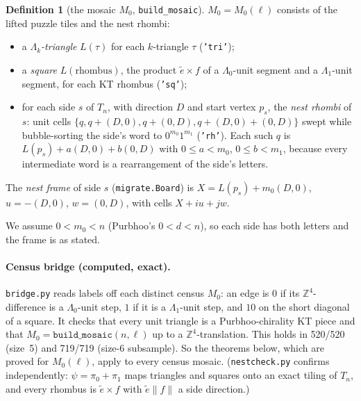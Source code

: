 \documentclass[11pt]{article}
\theoremstyle{definition}\newtheorem{definition}[theorem]{Definition}\newtheorem{remark}[theorem]{Remark}
\newcommand{\Z}{\mathbb Z}\newcommand{\R}{\mathbb R}
\begin{document}
\begin{definition}[the mosaic $M_0$, \texttt{build\_mosaic}]\label{def:M0}
$M_0=M_0(\ell)$ consists of the lifted puzzle tiles and the nest rhombi:
\begin{itemize}
\item a \emph{$\Lambda_k$-triangle} $L(\tau)$ for each $k$-triangle $\tau$ (\texttt{'tri'});
\item a \emph{square} $L(\text{rhombus})$, the product $\tilde e\times f$ of a $\Lambda_0$-unit segment and a $\Lambda_1$-unit segment, for each KT rhombus (\texttt{'sq'});
\item for each side $s$ of $T_n$, with direction $D$ and start vertex $p_s$, the \emph{nest rhombi} of $s$: unit cells $\{q,q+(D,0),q+(0,D),q+(D,0)+(0,D)\}$ swept while bubble-sorting the side's word to $0^{m_0}1^{m_1}$ (\texttt{'rh'}). Each such $q$ is $L(p_s)+a(D,0)+b(0,D)$ with $0\le a<m_0$, $0\le b<m_1$, because every intermediate word is a rearrangement of the side's letters.
\end{itemize}
The \emph{nest frame} of side $s$ (\texttt{migrate.Board}) is $X=L(p_s)+m_0(D,0)$, $u=-(D,0)$, $w=(0,D)$, with cells $X+iu+jw$.
\end{definition}
\noindent We assume $0<m_0<n$ (Purbhoo's $0<d<n$), so each side has both letters and the frame is as stated.

\paragraph{Census bridge (computed, exact).} \texttt{bridge.py} reads labels off each distinct census $M_0$: an edge is $0$ if its $\Z^4$-difference is a $\Lambda_0$-unit step, $1$ if it is a $\Lambda_1$-unit step, and $10$ on the short diagonal of a square. It checks that every unit triangle is a Purbhoo-chirality KT piece and that $M_0=\texttt{build\_mosaic}(n,\ell)$ up to a $\Z^4$-translation. This holds in 520/520 (size~5) and 719/719 (size-6 subsample). So the theorems below, which are proved for $M_0(\ell)$, apply to every census mosaic. (\texttt{nestcheck.py} confirms independently: $\psi=\pi_0+\pi_1$ maps triangles and squares onto an exact tiling of $T_n$, and every rhombus is $\tilde e\times f$ with $\tilde e\parallel f\parallel$ a side direction.)
\end{document}
